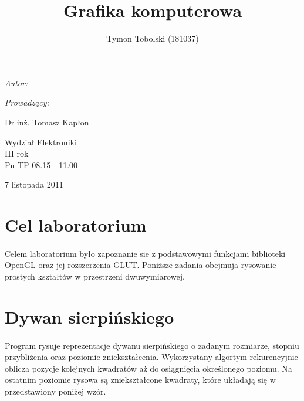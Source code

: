 \documentclass[wide,a4paper,titlepage,12pt] {article}
\title{Grafika komputerowa}
\author{Tymon Tobolski (181037)}
\makeatletter
\renewcommand{\maketitle}{
\begin{titlepage}
  \begin{center}
    \vspace*{3cm}
    \LARGE \@title \par
    \vspace{2cm}
    \textit{\small Autor:}\par
    \normalsize \@author\par \normalsize
    \vspace{3cm}
    \textit{\small Prowadzący:}\par
    Dr inż. Tomasz Kapłon \par
    \vspace{2cm}
    Wydział Elektroniki\\ III rok\\ Pn TP 08.15 - 11.00\par
    \vspace{4cm}
    \small 7 listopada 2011
  \end{center}
\end{titlepage}
}
\makeatother
\begin{document}
\maketitle
  \section{Cel laboratorium}
  \paragraph{}
  Celem laboratorium było zapoznanie sie z podstawowymi funkcjami biblioteki OpenGL oraz jej rozszerzenia GLUT.
  Poniższe zadania obejmuja rysowanie prostych kształtów w przestrzeni dwuwymiarowej.

  \section{Dywan sierpińskiego}
  \paragraph{}
  Program rysuje reprezentacje dywanu sierpińskiego
  o zadanym rozmiarze, stopniu przybliżenia oraz poziomie zniekształcenia.
  Wykorzystany algortym rekurencyjnie oblicza pozycje kolejnych kwadratów aż do
  osiągnięcia określonego poziomu. Na ostatnim poziomie rysowa są zniekształcone kwadraty, które układają się
  w przedstawiony poniżej wzór.

  \paragraph{}

  
\end{document}
